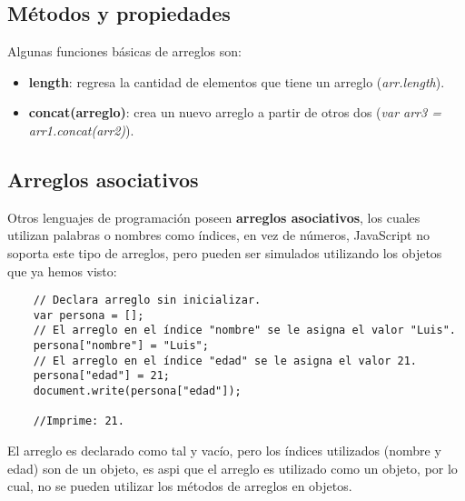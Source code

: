\subsection{Métodos y propiedades}
\hspace{0.55cm}Algunas funciones básicas de arreglos son:
\begin{itemize}
    \item \textbf{length}: regresa la cantidad de elementos que tiene un arreglo (\textit{arr.length}).
    \item \textbf{concat(arreglo)}: crea un nuevo arreglo a partir de otros dos (\textit{var arr3 = arr1.concat(arr2)}).
\end{itemize}


\subsection{Arreglos asociativos}
\hspace{0.55cm}Otros lenguajes de programación poseen \textbf{arreglos asociativos}, los cuales utilizan palabras o nombres como índices, en vez de números, JavaScript no soporta este tipo de arreglos, pero pueden ser simulados utilizando los objetos que ya hemos visto:
\begin{lstlisting}
    // Declara arreglo sin inicializar.
    var persona = [];
    // El arreglo en el índice "nombre" se le asigna el valor "Luis".
    persona["nombre"] = "Luis";
    // El arreglo en el índice "edad" se le asigna el valor 21.
    persona["edad"] = 21;
    document.write(persona["edad"]);

    //Imprime: 21.
\end{lstlisting}

El arreglo es declarado como tal y vacío, pero los índices utilizados (nombre y edad) son de un objeto, es aspi que el arreglo es utilizado como un objeto, por lo cual, no se pueden utilizar los métodos de arreglos en objetos.